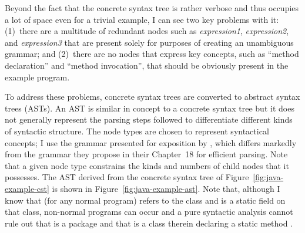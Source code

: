 Beyond the fact that the concrete syntax tree is rather verbose and thus occupies a lot of space even for a trivial example, I can see two key problems with it: (1)~there are a multitude of redundant nodes such as \textit{expression1}, \textit{expression2}, and \textit{expression3} that are present solely for purposes of creating an unambiguous grammar; and (2)~there are no nodes that express key concepts, such as ``method declaration'' and ``method invocation'', that should be obviously present in the example program.

To address these problems, concrete syntax trees are converted to abstract syntax trees (ASTs). An AST is similar in concept to a concrete syntax tree but it does not generally represent the parsing steps followed to differentiate different kinds of syntactic structure. The node types are chosen to represent syntactical concepts; I use the grammar presented for exposition by \citet{2012:book:gosling}, which differs markedly from the grammar they propose in their Chapter~18 for efficient parsing. Note that a given node type constrains the kinds and numbers of child nodes that it possesses. The AST derived from the concrete syntax tree of Figure~\ref{fig:java-example-cst} is shown in Figure~\ref{fig:java-example-ast}. Note that, although I know that (for any normal program)  refers to the class  and  is a static field on that class, non-normal programs can occur and a pure syntactic analysis cannot rule out that  is a package and that  is a class therein declaring a static method .

